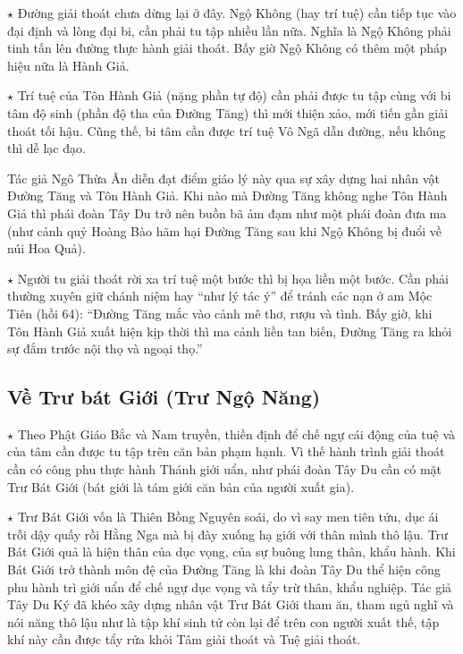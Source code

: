 $\star$ Đường giải thoát chưa dừng lại ở đây. Ngộ Không (hay trí tuệ) cần tiếp tục vào đại định và lòng đại bi, cần phải tu tập nhiều lần nữa. Nghĩa là Ngộ Không phải tinh tấn lên đường thực hành giải thoát. Bấy giờ Ngộ Không có thêm một pháp hiệu nữa là Hành Giả.

$\star$ Trí tuệ của Tôn Hành Giả (nặng phần tự độ) cần phải được tu tập cùng với bi tâm độ sinh (phần độ tha của Đường Tăng) thì mới thiện xảo, mới tiến gần giải thoát tối hậu. Cũng thế, bi tâm cần được trí tuệ Vô Ngã dẫn đường, nếu không thì dễ lạc đạo.

Tác giả Ngô Thừa Ân diễn đạt điểm giáo lý này qua sự xây dựng hai nhân vật Đường Tăng và Tôn Hành Giả. Khi nào mà Đường Tăng không nghe Tôn Hành Giả thì phái đoàn Tây Du trở nên buồn bã ảm đạm như một phái đoàn đưa ma (như cảnh quỷ Hoàng Bào hãm hại Đường Tăng sau khi Ngộ Không bị đuổi về núi Hoa Quả).

$\star$ Người tu giải thoát rời xa trí tuệ một bước thì bị họa liền một bước. Cần phải thường xuyên giữ chánh niệm hay ``như lý tác ý'' để tránh các nạn ở am Mộc Tiên (hồi 64): ``Đường Tăng mắc vào cảnh mê thơ, rượu và tình. Bấy giờ, khi Tôn Hành Giả xuất hiện kịp thời thì ma cảnh liền tan biến, Đường Tăng ra khỏi sự đắm trước nội thọ và ngoại thọ.''
\subsection{Về Trư bát Giới (Trư Ngộ Năng)} %
\label{sub:ve_tru_bat_gioi}

$\star$ Theo Phật Giáo Bắc và Nam truyền, thiền định để chế ngự cái động của tuệ và của tâm cần được tu tập trên căn bản phạm hạnh. Vì thế hành trình giải thoát cần có công phu thực hành Thánh giới uẩn, như phái đoàn Tây Du cần có mặt Trư Bát Giới (bát giới là tám giới căn bản của người xuất gia).

$\star$ Trư Bát Giới vốn là Thiên Bồng Nguyên soái, do vì say men tiên tửu, dục ái trỗi dậy quấy rồi Hằng Nga mà bị đày xuống hạ giới với thân mình thô lậu. Trư Bát Giới quả là hiện thân của dục vọng, của sự buông lung thân, khẩu hành. Khi Bát Giới trở thành môn đệ của Đường Tăng là khi đoàn Tây Du thể hiện công phu hành trì giới uẩn để chế ngự dục vọng và tẩy trừ thân, khẩu nghiệp. Tác giả Tây Du Ký đã khéo xây dựng nhân vật Trư Bát Giới tham ăn, tham ngủ nghĩ và nói năng thô lậu như là tập khí sinh tử còn lại để trên con người xuất thế, tập khí này cần được tẩy rửa khỏi Tâm giải thoát và Tuệ giải thoát.

